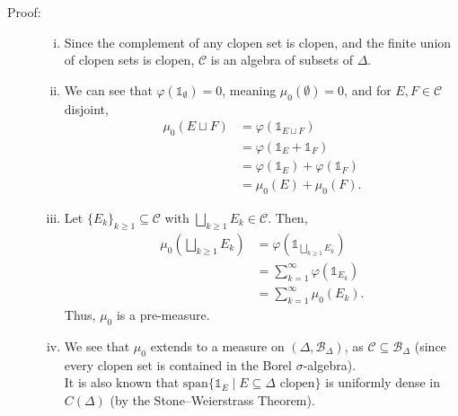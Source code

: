 \documentclass[10pt]{extarticle}
\begin{document}
  \begin{description}
    \item[Proof:]\hfill
      \begin{enumerate}[(i)]
        \item Since the complement of any clopen set is clopen, and the finite union of clopen sets is clopen, $\mathcal{C}$ is an algebra of subsets of $\Delta$.
        \item We can see that $\varphi(\mathbb{1}_{\emptyset}) = 0$, meaning $\mu_0(\emptyset) = 0$, and for $E,F\in \mathcal{C}$ disjoint,
          \begin{align*}
            \mu_0(E\sqcup F) &= \varphi(\mathbb{1}_{E\sqcup F})\\
                             &= \varphi(\mathbb{1}_{E} + \mathbb{1}_{F})\\
                             &= \varphi(\mathbb{1}_{E}) + \varphi(\mathbb{1}_{F})\\
                             &= \mu_0(E) + \mu_0(F).
          \end{align*}
        \item Let $\{E_k\}_{k\geq 1}\subseteq \mathcal{C}$ with $\bigsqcup_{k\geq 1}E_k \in \mathcal{C}$. Then,
          \begin{align*}
            \mu_0\left(\bigsqcup_{k\geq 1}E_k\right) &= \varphi\left(\mathbb{1}_{\bigsqcup_{k\geq 1}E_k}\right)\\
                                                     &= \sum_{k = 1}^{\infty}\varphi(\mathbb{1}_{E_k})\\
                                                     &= \sum_{k=1}^{\infty}\mu_0(E_k).
          \end{align*}
          Thus, $\mu_0$ is a pre-measure.
        \item We see that $\mu_{0}$ extends to a measure on $(\Delta,\mathcal{B}_{\Delta})$, as $\mathcal{C}\subseteq \mathcal{B}_{\Delta}$ (since every clopen set is contained in the Borel $\sigma$-algebra).\\

          It is also known that $\text{span}\{\mathbb{1}_{E}\mid E\subseteq \Delta\text{ clopen}\}$ is uniformly dense in $C(\Delta)$ (by the Stone--Weierstrass Theorem).
      \end{enumerate}
  \end{description}
\end{document}
